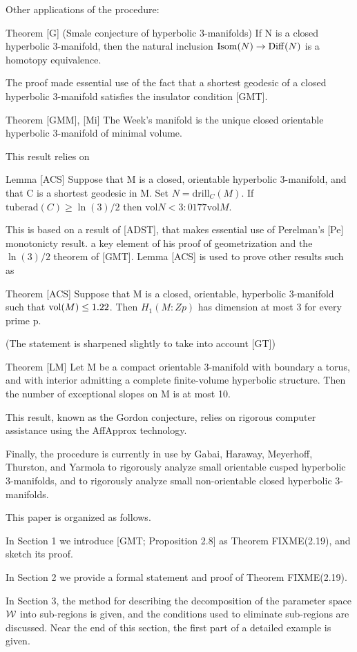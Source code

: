Other applications of the procedure:

Theorem [G]  (Smale conjecture of hyperbolic 3-manifolds)
If N is a closed hyperbolic 3-manifold,
then the natural inclusion ${\rm Isom}(N)\to {\rm Diff}(N)$ is a homotopy equivalence.

The proof made essential use of the fact that a shortest geodesic
of a closed hyperbolic 3-manifold satisfies the insulator condition [GMT].

Theorem [GMM], [Mi] The Week's manifold
is the unique closed orientable hyperbolic 3-manifold of minimal volume.

This result relies on 

Lemma [ACS] Suppose that M is a closed, orientable hyperbolic 3-manifold,
and that C is a shortest geodesic in M.
Set $N = \mathrm{drill}_C(M)$. If $\mathrm{tuberad}(C) \ge \ln(3)/2$ then
$\mathrm{vol} N < 3:0177 \mathrm{vol}M$.

This is based on a result of [ADST],
that makes essential use of Perelman's [Pe] monotonicty result.
a key element of his proof of geometrization and the $\ln(3)/2$
theorem of [GMT].
Lemma [ACS] is used to prove other results such as 

Theorem [ACS] Suppose that M is a closed, orientable, hyperbolic
3-manifold such that ${\rm vol}(M) \le 1.22$.
Then $H_1(M:Zp)$ has dimension at most 3 for every prime p.

(The statement is sharpened slightly to take into account [GT])

Theorem [LM] Let M be a compact orientable 3-manifold with boundary a torus,
and with interior admitting a complete finite-volume hyperbolic structure.
Then the number of exceptional slopes on M is at most 10.

This result, known as the Gordon conjecture,
relies on rigorous computer assistance using the AffApprox technology.

Finally, the procedure is currently in use
by Gabai, Haraway, Meyerhoff, Thurston, and Yarmola
to rigorously analyze small orientable cusped hyperbolic $3$-manifolds,
and to rigorously analyze small non-orientable closed hyperbolic $3$-manifolds.


This paper is organized as follows.

In Section 1 we introduce [GMT; Proposition 2.8] as Theorem FIXME(2.19),
and sketch its proof.

In Section 2 we provide a formal statement and proof of Theorem FIXME(2.19).

In Section 3,
the method for describing the decomposition
of the parameter space ${\cal W}$ into sub-regions is given,
and the conditions used to eliminate sub-regions are discussed.
Near the end of this section, the first part of a detailed example is given.

